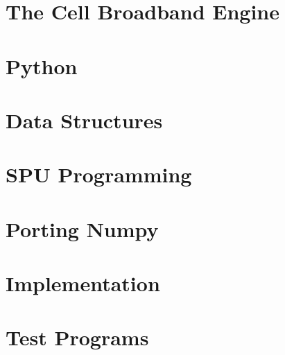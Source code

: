 \documentclass[10pt,a4paper,onesided]{report}
\begin{document}
\chapter{The Cell Broadband Engine}
\prepchapter
\label{chapter:cell}


\chapter{Python}
\prepchapter
\label{chapter:python}


%

\chapter{Data Structures}
\prepchapter
\label{chapter:analysis}



\chapter{SPU Programming}
\prepchapter
\label{chapter:dispatcher}



\chapter{Porting Numpy}
\prepchapter
\label{chapter:numpy}


%


\chapter{Implementation}
\prepchapter
\label{chapter:implementation}


\chapter{Test Programs}
\prepchapter
\label{chapter:testprograms}

\end{document}
